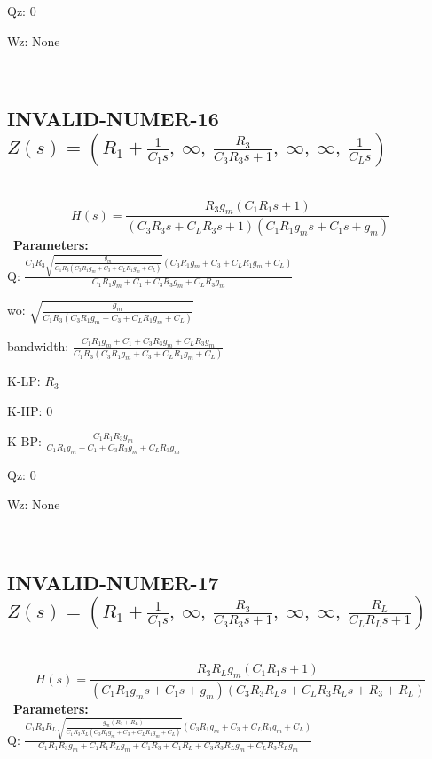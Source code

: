 \documentclass{article}
\begin{document}
Qz: $0$\ 

Wz: $\text{None}$\ 

\ 

\subsection{INVALID-NUMER-16 $Z(s) = \left( R_{1} + \frac{1}{C_{1} s}, \  \infty, \  \frac{R_{3}}{C_{3} R_{3} s + 1}, \  \infty, \  \infty, \  \frac{1}{C_{L} s}\right)$ } \ 
\textbf{\[H(s) = \frac{R_{3} g_{m} \left(C_{1} R_{1} s + 1\right)}{\left(C_{3} R_{3} s + C_{L} R_{3} s + 1\right) \left(C_{1} R_{1} g_{m} s + C_{1} s + g_{m}\right)}\] } \ 
\textbf{Parameters:}\\ 

Q: $\frac{C_{1} R_{3} \sqrt{\frac{g_{m}}{C_{1} R_{3} \left(C_{3} R_{1} g_{m} + C_{3} + C_{L} R_{1} g_{m} + C_{L}\right)}} \left(C_{3} R_{1} g_{m} + C_{3} + C_{L} R_{1} g_{m} + C_{L}\right)}{C_{1} R_{1} g_{m} + C_{1} + C_{3} R_{3} g_{m} + C_{L} R_{3} g_{m}}$\ 

wo: $\sqrt{\frac{g_{m}}{C_{1} R_{3} \left(C_{3} R_{1} g_{m} + C_{3} + C_{L} R_{1} g_{m} + C_{L}\right)}}$\ 

bandwidth: $\frac{C_{1} R_{1} g_{m} + C_{1} + C_{3} R_{3} g_{m} + C_{L} R_{3} g_{m}}{C_{1} R_{3} \left(C_{3} R_{1} g_{m} + C_{3} + C_{L} R_{1} g_{m} + C_{L}\right)}$\ 

K-LP: $R_{3}$\ 

K-HP: $0$\ 

K-BP: $\frac{C_{1} R_{1} R_{3} g_{m}}{C_{1} R_{1} g_{m} + C_{1} + C_{3} R_{3} g_{m} + C_{L} R_{3} g_{m}}$\ 

Qz: $0$\ 

Wz: $\text{None}$\ 

\ 

\subsection{INVALID-NUMER-17 $Z(s) = \left( R_{1} + \frac{1}{C_{1} s}, \  \infty, \  \frac{R_{3}}{C_{3} R_{3} s + 1}, \  \infty, \  \infty, \  \frac{R_{L}}{C_{L} R_{L} s + 1}\right)$ } \ 
\textbf{\[H(s) = \frac{R_{3} R_{L} g_{m} \left(C_{1} R_{1} s + 1\right)}{\left(C_{1} R_{1} g_{m} s + C_{1} s + g_{m}\right) \left(C_{3} R_{3} R_{L} s + C_{L} R_{3} R_{L} s + R_{3} + R_{L}\right)}\] } \ 
\textbf{Parameters:}\\ 

Q: $\frac{C_{1} R_{3} R_{L} \sqrt{\frac{g_{m} \left(R_{3} + R_{L}\right)}{C_{1} R_{3} R_{L} \left(C_{3} R_{1} g_{m} + C_{3} + C_{L} R_{1} g_{m} + C_{L}\right)}} \left(C_{3} R_{1} g_{m} + C_{3} + C_{L} R_{1} g_{m} + C_{L}\right)}{C_{1} R_{1} R_{3} g_{m} + C_{1} R_{1} R_{L} g_{m} + C_{1} R_{3} + C_{1} R_{L} + C_{3} R_{3} R_{L} g_{m} + C_{L} R_{3} R_{L} g_{m}}$\ 
\end{document}
